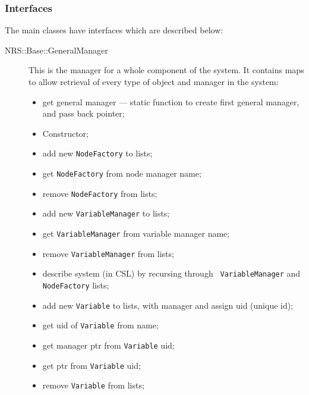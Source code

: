 \documentclass[pdftex,a4paper]{article}
\begin{document}
\subsubsection{Interfaces}

The main classes have interfaces which are described below:

\begin{description}

\item[NRS::Base::GeneralManager] This is the manager for a whole
  component of the system. It contains maps to allow retrieval of
  every type of object and manager in the system:

\begin{itemize}

\item get general manager --- static function to create first general
  manager, and pass back pointer;

\item Constructor;

\item add new {\tt NodeFactory} to lists;

\item get {\tt NodeFactory} from node manager name;

\item remove {\tt NodeFactory} from lists;

\item add new {\tt VariableManager} to lists;

\item get {\tt VariableManager} from variable manager name;

\item remove {\tt VariableManager} from lists;

\item describe system (in CSL) by recursing through {\tt
  VariableManager} and {\tt NodeFactory} lists;

\item add new {\tt Variable} to lists, with manager and assign uid
(unique id);

\item get uid of {\tt Variable} from name;

\item get manager ptr from {\tt Variable} uid;

\item get ptr from {\tt Variable} uid;

\item remove {\tt Variable} from lists;


\end{itemize}
\end{description}
\end{document}
